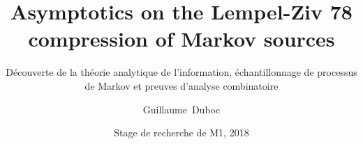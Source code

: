


{
}


\usepackage{appendixnumberbeamer}
\usepackage{times}

\usepackage{graphicx}
\usepackage{capt-of}
\usepackage{booktabs}
\usepackage{varwidth}

\newcommand\Fontvi{\fontsize{8}{8.2}\selectfont}

\usepackage{appendixnumberbeamer}

\usepackage[]{algorithm2e}

\usepackage{booktabs}

\usepackage[scale=2]{ccicons}

\usepackage{pgfplots}
\pgfplotsset{compat=1.16}

\usepackage{mathtools}
\DeclarePairedDelimiter{\ceil}{\lceil}{\rceil}

\usepackage{xspace}
\newcommand{\themename}{\textbf{\textsc{metropolis}}\xspace}

\title[Asymptotics on the Lempel-Ziv 78 compression of Markov sources]
{Asymptotics on the Lempel-Ziv 78 compression of Markov sources}

\subtitle
{Découverte de la théorie analytique de l'information,
échantillonnage de processus de Markov et preuves
d'analyse combinatoire}

\author[Duboc]
{Guillaume~Duboc}


\date[M1 2018]
{Stage de recherche de M1, 2018}

\subject{Informatique Fondamentale}




\expandafter\def\expandafter\insertshorttitle\expandafter{%
\insertframenumber\,/\,\inserttotalframenumber}

